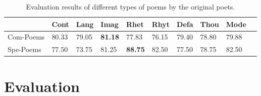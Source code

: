 \documentclass[11pt]{article}
\begin{document}






\begin{table}
  \centering
  \begin{tabular}{llllllllll}
    \hline
    &  Cont         & Lang   & Imag & Rhet
 & Rhyt & Defa  & Thou & Mode \\
    \hline
    Com-Poems & 80.33  & 79.05 & \textbf{81.18}  & 77.83  & 76.15 & 79.40 & 78.80 & 79.88 &     \\
    Spe-Poems & 77.50  & 73.75 & 81.25  & \textbf{88.75}  & 82.50 & 77.50 & 78.75 & 82.50  \\
    \hline
  \end{tabular}
  \caption{\label{40 common types of poems}
    Evaluation results of different types of poems by the original poets. 
  }
\end{table}




\section{Evaluation}
\label{Evaluation}

\end{document}
